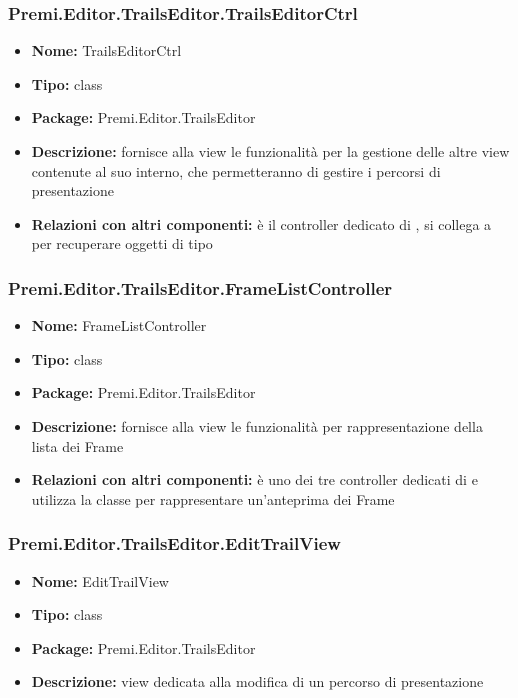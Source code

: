 \subsubsection{Premi.Editor.TrailsEditor.TrailsEditorCtrl}
\begin{itemize}
  \item \textbf{Nome:} TrailsEditorCtrl
  \item \textbf{Tipo:} class
  \item \textbf{Package:} Premi.Editor.TrailsEditor
  \item \textbf{Descrizione:} fornisce alla view le funzionalità per la gestione delle altre view contenute al suo interno, che permetteranno di gestire i percorsi di presentazione
  \item \textbf{Relazioni con altri componenti:}  è il controller dedicato di   , si collega a  per recuperare oggetti di tipo 
\end{itemize}
\subsubsection{Premi.Editor.TrailsEditor.FrameListController}
\begin{itemize}
  \item \textbf{Nome:} FrameListController
  \item \textbf{Tipo:} class
  \item \textbf{Package:} Premi.Editor.TrailsEditor
  \item \textbf{Descrizione:} fornisce alla view  le funzionalità per rappresentazione della lista dei Frame
  \item \textbf{Relazioni con altri componenti:} è uno dei tre controller dedicati di    e utilizza la classe  per rappresentare un'anteprima dei Frame
\end{itemize}
\subsubsection{Premi.Editor.TrailsEditor.EditTrailView}
\begin{itemize}
  \item \textbf{Nome:} EditTrailView
  \item \textbf{Tipo:} class
  \item \textbf{Package:} Premi.Editor.TrailsEditor
  \item \textbf{Descrizione:} view dedicata alla modifica di un percorso di presentazione
\end{itemize}
